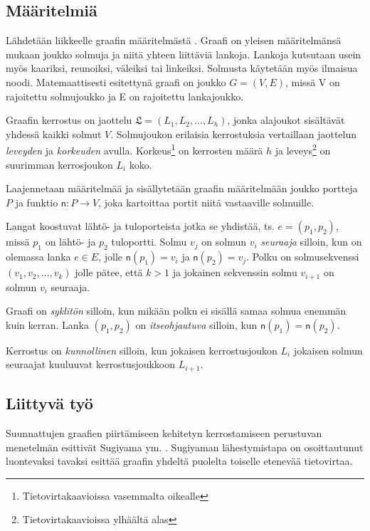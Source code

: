 \documentclass[finnish,12pt]{article}
\begin{document}
	\subsection{Määritelmiä}

Lähdetään liikkeelle graafin määritelmästä \cite{RefWorks:39}.
Graafi on yleisen määritelmänsä mukaan joukko solmuja ja niitä yhteen liittäviä lankoja.
Lankoja kutsutaan usein myös kaariksi, reunoiksi, väleiksi tai linkeiksi. Solmusta käytetään myös ilmaisua noodi.
Matemaattisesti esitettynä graafi on joukko $G = (V, E)$, missä V on rajoitettu solmujoukko ja E on rajoitettu lankajoukko.

Graafin kerrostus on jaottelu $\mathfrak{L} = (L_1, L_2, ..., L_h)$, jonka alajoukot sisältävät yhdessä kaikki solmut $V$.
Solmujoukon erilaisia kerrostuksia vertaillaan jaottelun \emph{leveyden} ja \emph{korkeuden} avulla.
Korkeus\footnote{Tietovirtakaavioissa vasemmalta oikealle} on kerrosten määrä $h$ ja leveys\footnote{Tietovirtakaavioissa ylhäältä alas} on suurimman kerrosjoukon $L_i$ koko.

Laajennetaan määritelmää ja sisällytetään graafin määritelmään joukko portteja $P$ ja funktio $\mathsf{n} : P \rightarrow V$, joka kartoittaa portit niitä vastaaville solmuille.

Langat koostuvat lähtö- ja tuloporteista jotka se yhdistää, ts. $e = (p_1, p_2)$, missä $p_1$ on lähtö- ja $p_2$ tuloportti.
Solmu $v_j$ on solmun $v_i$ \emph{seuraaja} silloin, kun on olemassa lanka $e \in E$, jolle $\mathsf{n}(p_1) = v_i$ ja $\mathsf{n}(p_2) = v_j$.
Polku on solmusekvenssi $(v_1, v_2, ..., v_k)$ jolle pätee, että $k>1$ ja jokainen sekvenssin solmu $v_{i+1}$ on solmun $v_i$ seuraaja.

Graafi on \emph{syklitön} silloin, kun mikään polku ei sisällä samaa solmua enemmän kuin kerran.
Lanka $(p_1, p_2)$ on \emph{itseohjautuva} silloin, kun $\mathsf{n}(p_1) = \mathsf{n}(p_2)$.

Kerrostus on \emph{kunnollinen} silloin, kun jokaisen kerrostusjoukon $L_i$ jokaisen solmun seuraajat kuuluuvat kerrostusjoukkoon $L_{i+1}$.
 
	\subsection{Liittyvä työ}

Suunnattujen graafien piirtämiseen kehitetyn kerrostamiseen perustuvan menetelmän esittivät Sugiyama ym. \cite{RefWorks:9}.
Sugiyaman lähestymistapa on osoittautunut luontevaksi tavaksi esittää graafin yhdeltä puolelta toiselle etenevää tietovirtaa.
\end{document}

